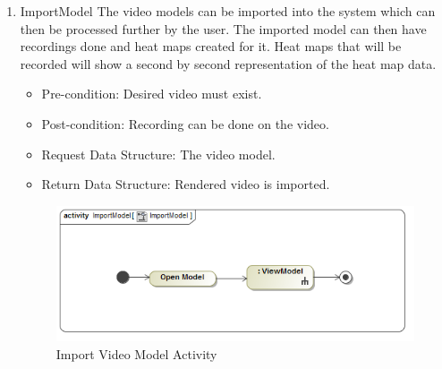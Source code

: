 		\begin{enumerate}
			\item{ImportModel}
			\newline
			The video models can be imported into the system which can then be processed further by the user. The imported model can then have recordings done and heat maps created for it. Heat maps that will be recorded will show a second by second representation of the heat map data.
			\begin{itemize}
				\item Pre-condition: Desired video must exist.
				\item Post-condition: Recording can be done on the video.
				\item Request Data Structure: The video model.
				\item Return Data Structure: Rendered video is imported.
			\end{itemize}
			
			\begin{figure}[!ht]
				\centering
				\includegraphics[scale=0.5]{Diagrams/Activity_Diagram__ImportModel__ImportModel.png}
				\caption{Import Video Model Activity}
			\end{figure}
			

\end{enumerate}
